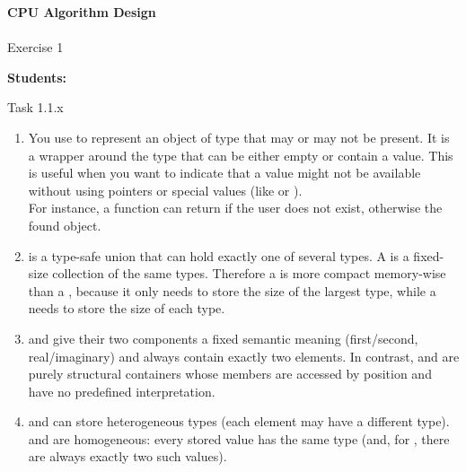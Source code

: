 





\begin{Large}
    \textsf{\textbf{CPU Algorithm Design}} \\
    \\
    Exercise 1
\end{Large}
\vspace{1ex}
\textsf{\textbf{Students:}}  \\
\vspace{2ex}

\begin{problem}{}{Task 1.1.x}
    \begin{enumerate}[(1)]
        \item 
            You use  to represent an object of type  that may or may not be present. 
            It is a wrapper around the type  that can be either empty or contain a value. 
            This is useful when you want to indicate that a value might not be available without using pointers or special 
            values (like  or ). \\
            For instance, a  function can return 
            if the user does not exist, otherwise the found  object.
        \item 
             is a type-safe union that can hold exactly one of several types. 
            A  is a fixed-size collection of the same types.
            Therefore a  is more compact memory-wise than a , 
            because it only needs to store the size of the largest type, while a  
            needs to store the size of each type.
        \item  
             and  give their two
            components a fixed semantic meaning (first/second,
            real/imaginary) and always contain exactly two elements.  
            In contrast,  and  are
            purely structural containers whose members are accessed by
            position and have no predefined interpretation.

        \item  
             and  can store
            heterogeneous types (each element may have a different
            type).  
             and 
            are homogeneous: every stored value has the same type
             (and, for , there are always
            exactly two such values).


\end{enumerate}
\end{problem}
